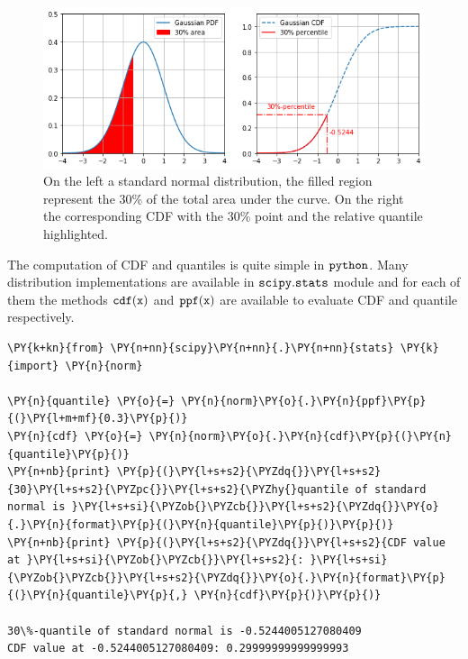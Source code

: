 \begin{figure}[htb]
	\centering
	\includegraphics[width=1.\textwidth]{figures/percentile.png}
	\caption{On the left a standard normal distribution, the filled region represent the 30\% of the total area
		under the curve. On the right the corresponding CDF with the 30\% point and the relative quantile highlighted.}
	\label{fig:percentile}
\end{figure}

The computation of CDF and quantiles is quite simple in \(\tt{python}\).
Many distribution implementations are available in \(\tt{scipy.stats}\)
module and for each of them the methods \(\tt{cdf(x)}\) and
\(\tt{ppf(x)}\) are available to evaluate CDF and quantile respectively.

\begin{tcolorbox}[breakable, size=fbox, boxrule=1pt, pad at break*=1mm,colback=cellbackground, colframe=cellborder]
\begin{Verbatim}[commandchars=\\\{\}]
\PY{k+kn}{from} \PY{n+nn}{scipy}\PY{n+nn}{.}\PY{n+nn}{stats} \PY{k}{import} \PY{n}{norm}
		
\PY{n}{quantile} \PY{o}{=} \PY{n}{norm}\PY{o}{.}\PY{n}{ppf}\PY{p}{(}\PY{l+m+mf}{0.3}\PY{p}{)}
\PY{n}{cdf} \PY{o}{=} \PY{n}{norm}\PY{o}{.}\PY{n}{cdf}\PY{p}{(}\PY{n}{quantile}\PY{p}{)}		
\PY{n+nb}{print} \PY{p}{(}\PY{l+s+s2}{\PYZdq{}}\PY{l+s+s2}{30}\PY{l+s+s2}{\PYZpc{}}\PY{l+s+s2}{\PYZhy{}quantile of standard normal is }\PY{l+s+si}{\PYZob{}\PYZcb{}}\PY{l+s+s2}{\PYZdq{}}\PY{o}{.}\PY{n}{format}\PY{p}{(}\PY{n}{quantile}\PY{p}{)}\PY{p}{)}
\PY{n+nb}{print} \PY{p}{(}\PY{l+s+s2}{\PYZdq{}}\PY{l+s+s2}{CDF value at }\PY{l+s+si}{\PYZob{}\PYZcb{}}\PY{l+s+s2}{: }\PY{l+s+si}{\PYZob{}\PYZcb{}}\PY{l+s+s2}{\PYZdq{}}\PY{o}{.}\PY{n}{format}\PY{p}{(}\PY{n}{quantile}\PY{p}{,} \PY{n}{cdf}\PY{p}{)}\PY{p}{)}
		
30\%-quantile of standard normal is -0.5244005127080409
CDF value at -0.5244005127080409: 0.29999999999999993
\end{Verbatim}
\end{tcolorbox}

